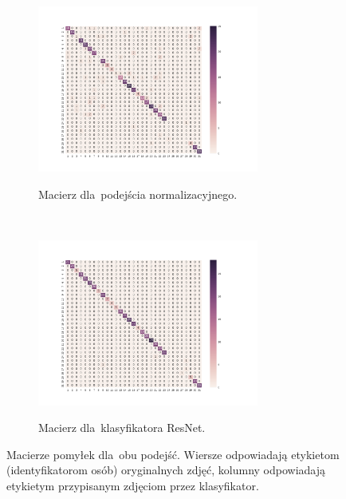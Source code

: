 \documentclass[11pt,a4paper]{article}
\begin{document}
\begin{figure}[H]
    \begin{subfigure}{\textwidth}
        \centering
        \includegraphics[width=0.8\textwidth]{res/img/normalized_confusion_matrix.pdf}
        \label{subfig:normalized-distance-matrix}
        \caption{Macierz dla~podejścia normalizacyjnego.}
    \end{subfigure}
    \\
    \begin{subfigure}{\textwidth}
        \centering
        \includegraphics[width=0.8\textwidth]{res/img/resnet_confusion_matrix.pdf}
        \label{subfig:resnet-distance-matrix}
        \caption{Macierz dla~klasyfikatora ResNet.}
    \end{subfigure}
    \caption{Macierze pomyłek dla~obu podejść.
    Wiersze odpowiadają etykietom (identyfikatorom osób) oryginalnych zdjęć,
    kolumny odpowiadają etykietym przypisanym zdjęciom przez klasyfikator.}
\end{figure}
\end{document}
